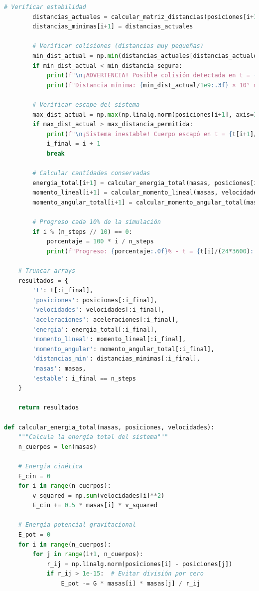 \documentclass{article}
\begin{document}
\begin{lstlisting}[language=Python, caption={Sistema completo de 4 cuerpos con análisis dinámico}]
        # Verificar estabilidad
        distancias_actuales = calcular_matriz_distancias(posiciones[i+1])
        distancias_minimas[i+1] = distancias_actuales
        
        # Verificar colisiones (distancias muy pequeñas)
        min_dist_actual = np.min(distancias_actuales[distancias_actuales > 0])
        if min_dist_actual < min_distancia_segura:
            print(f"\n¡ADVERTENCIA! Posible colisión detectada en t = {t[i+1]/(24*3600):.2f} días")
            print(f"Distancia mínima: {min_dist_actual/1e9:.3f} × 10⁹ m")
        
        # Verificar escape del sistema
        max_dist_actual = np.max(np.linalg.norm(posiciones[i+1], axis=1))
        if max_dist_actual > max_distancia_permitida:
            print(f"\n¡Sistema inestable! Cuerpo escapó en t = {t[i+1]/(24*3600):.2f} días")
            i_final = i + 1
            break
        
        # Calcular cantidades conservadas
        energia_total[i+1] = calcular_energia_total(masas, posiciones[i+1], velocidades[i+1])
        momento_lineal[i+1] = calcular_momento_lineal(masas, velocidades[i+1])
        momento_angular_total[i+1] = calcular_momento_angular_total(masas, posiciones[i+1], velocidades[i+1])
        
        # Progreso cada 10% de la simulación
        if i % (n_steps // 10) == 0:
            porcentaje = 100 * i / n_steps
            print(f"Progreso: {porcentaje:.0f}% - t = {t[i]/(24*3600):.1f} días")
    
    # Truncar arrays
    resultados = {
        't': t[:i_final],
        'posiciones': posiciones[:i_final],
        'velocidades': velocidades[:i_final],
        'aceleraciones': aceleraciones[:i_final],
        'energia': energia_total[:i_final],
        'momento_lineal': momento_lineal[:i_final],
        'momento_angular': momento_angular_total[:i_final],
        'distancias_min': distancias_minimas[:i_final],
        'masas': masas,
        'estable': i_final == n_steps
    }
    
    return resultados

def calcular_energia_total(masas, posiciones, velocidades):
    """Calcula la energía total del sistema"""
    n_cuerpos = len(masas)
    
    # Energía cinética
    E_cin = 0
    for i in range(n_cuerpos):
        v_squared = np.sum(velocidades[i]**2)
        E_cin += 0.5 * masas[i] * v_squared
    
    # Energía potencial gravitacional
    E_pot = 0
    for i in range(n_cuerpos):
        for j in range(i+1, n_cuerpos):
            r_ij = np.linalg.norm(posiciones[i] - posiciones[j])
            if r_ij > 1e-15:  # Evitar división por cero
                E_pot -= G * masas[i] * masas[j] / r_ij
    

\end{lstlisting}
\end{document}
